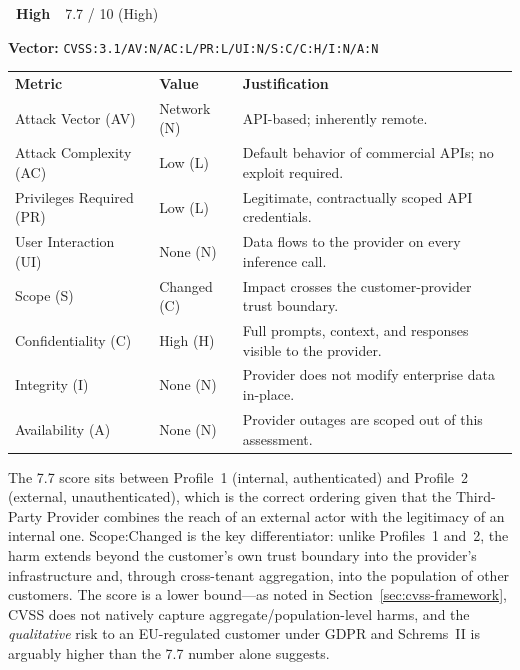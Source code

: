 \documentclass[a4paper,12pt]{report}
\newcommand{\badgehigh}{%
  \colorbox{warn}{\color{white}\small\textbf{~High~}}}
\newcommand{\cvssvec}[1]{\texttt{\small #1}}
\begin{document}
\begin{cvssbox}{\badgehigh\ 7.7 / 10 (High)}
\vspace{2pt}
\begin{center}
\textbf{Vector:}\enspace
\cvssvec{CVSS:3.1/AV:N/AC:L/PR:L/UI:N/S:C/C:H/I:N/A:N}
\end{center}
\vspace{8pt}
\begin{tabular}{L{3.4cm} L{2.2cm} L{7.8cm}}
  \color{white}\small\textbf{Metric} &
  \color{white}\small\textbf{Value} &
  \color{white}\small\textbf{Justification} \\
  \small Attack Vector (AV)     & \small Network (N) & \small API-based; inherently remote. \\
  \small Attack Complexity (AC) & \small Low (L)     & \small Default behavior of commercial APIs; no exploit required. \\
  \small Privileges Required (PR)  & \small Low (L)  & \small Legitimate, contractually scoped API credentials. \\
  \small User Interaction (UI)  & \small None (N)    & \small Data flows to the provider on every inference call. \\
  \small Scope (S)              & \small Changed (C) & \small Impact crosses the customer-provider trust boundary. \\
  \small Confidentiality (C)    & \small High (H)    & \small Full prompts, context, and responses visible to the provider. \\
  \small Integrity (I)          & \small None (N)    & \small Provider does not modify enterprise data in-place. \\
  \small Availability (A)       & \small None (N)    & \small Provider outages are scoped out of this assessment. \\
\end{tabular}
\vspace{6pt}

\small The 7.7 score sits between Profile~1 (internal, authenticated) and
Profile~2 (external, unauthenticated), which is the correct ordering
given that the Third-Party Provider combines the reach of an external
actor with the legitimacy of an internal one. Scope:Changed is the key
differentiator: unlike Profiles~1 and~2, the harm extends beyond the
customer's own trust boundary into the provider's infrastructure and,
through cross-tenant aggregation, into the population of other customers.
The score is a lower bound---as noted in Section~\ref{sec:cvss-framework},
CVSS does not natively capture aggregate/population-level harms, and the
\emph{qualitative} risk to an EU-regulated customer under GDPR and
Schrems~II is arguably higher than the 7.7 number alone suggests.
\end{cvssbox}
\end{document}
